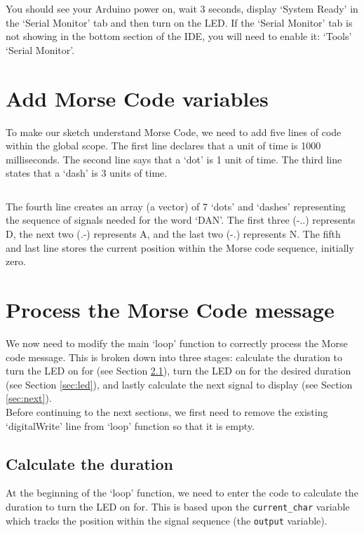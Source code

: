 \documentclass[11pt,a4paper]{article}
\begin{document}
\noindent
You should see your Arduino power on, wait 3 seconds, display `System Ready' in the `Serial Monitor' tab and then turn on the LED. If the `Serial Monitor' tab is not showing in the bottom section of the IDE, you will need to enable it: `Tools' \textrightarrow `Serial Monitor'.

\section{Add Morse Code variables}
To make our sketch understand Morse Code, we need to add five lines of code within the global scope. The first line declares that a unit of time is 1000 milliseconds. The second line says that a `dot' is 1 unit of time. The third line states that a `dash' is 3 units of time.\\ 

\inputminted{arduino}{./src/2-morse-code-variables.txt}

\noindent
The fourth line creates an array (a vector) of 7 `dots' and `dashes' representing the sequence of signals needed for the word `DAN'. The first three (-..) represents D, the next two (.-) represents A, and the last two (-.) represents N. The fifth and last line stores the current position within the Morse code sequence, initially zero.

\section{Process the Morse Code message}
We now need to modify the main `loop' function to correctly process the Morse code message. This is broken down into three stages: calculate the duration to turn the LED on for (see Section \ref{sec:duration}), turn the LED on for the desired duration (see Section \ref{sec:led}), and lastly calculate the next signal to display (see Section \ref{sec:next}).\\

\noindent
Before continuing to the next sections, we first need to remove the existing `digitalWrite' line from `loop' function so that it is empty.

\subsection{Calculate the duration}
\label{sec:duration}
At the beginning of the `loop' function, we need to enter the code to calculate the duration to turn the LED on for. This is based upon the \verb|current_char| variable which tracks the position within the signal sequence (the \verb|output| variable).\\
\end{document}
